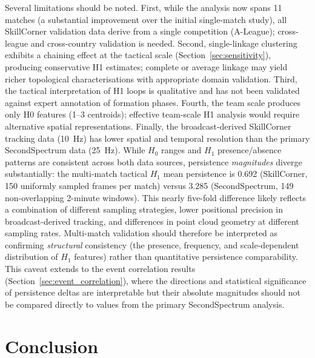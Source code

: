 \documentclass[11pt,a4paper]{article}
\begin{document}
Several limitations should be noted.  First, while the
analysis now spans 11 matches (a substantial improvement
over the initial single-match study), all SkillCorner
validation data derive from a single competition (A-League);
cross-league and cross-country validation is needed.
Second, single-linkage clustering exhibits a chaining effect
at the tactical scale (Section~\ref{sec:sensitivity}),
producing conservative H1 estimates; complete or average
linkage may yield richer topological characterisations with
appropriate domain validation.  Third, the tactical
interpretation of H1 loops is qualitative and has not been
validated against expert annotation of formation phases.
Fourth, the team scale produces only H0 features (1--3
centroids); effective team-scale H1 analysis would require
alternative spatial representations.  Finally, the
broadcast-derived SkillCorner tracking data (10~Hz) has lower
spatial and temporal resolution than the primary SecondSpectrum
data (25~Hz).  While \(H_0\) ranges and \(H_1\)
presence/absence patterns are consistent across both data
sources, persistence \emph{magnitudes} diverge substantially:
the multi-match tactical \(H_1\) mean persistence is 0.692
(SkillCorner, 150 uniformly sampled frames per match) versus
3.285 (SecondSpectrum, 149 non-overlapping 2-minute windows).
This nearly five-fold difference likely reflects a combination
of different sampling strategies, lower positional precision in
broadcast-derived tracking, and differences in point cloud
geometry at different sampling rates.  Multi-match validation
should therefore be interpreted as confirming \emph{structural}
consistency (the presence, frequency, and scale-dependent
distribution of \(H_1\) features) rather than quantitative
persistence comparability.  This caveat extends to the event
correlation results (Section~\ref{sec:event_correlation}),
where the directions and statistical significance of
persistence deltas are interpretable but their absolute
magnitudes should not be compared directly to values from the
primary SecondSpectrum analysis.

\section{Conclusion}
\label{sec:conclusion}
\end{document}
